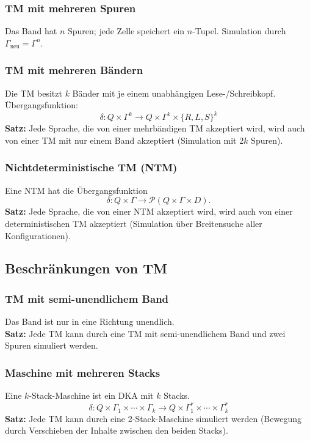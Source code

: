 \subsubsection{TM mit mehreren Spuren}
Das Band hat \(n\) Spuren; jede Zelle speichert ein \(n\)-Tupel. Simulation durch
\(\Gamma_{\text{neu}} = \Gamma^n\).

\subsubsection{TM mit mehreren Bändern}
Die TM besitzt \(k\) Bänder mit je einem unabhängigen Lese-/Schreibkopf.
Übergangsfunktion:
\[
    \delta : Q \times \Gamma^k \to Q \times \Gamma^k \times \{R, L, S\}^k
\]
\textbf{Satz:} Jede Sprache, die von einer mehrbändigen TM akzeptiert wird, wird auch von einer TM mit nur einem Band akzeptiert (Simulation mit \(2k\) Spuren).

\subsubsection{Nichtdeterministische TM (NTM)}
Eine NTM hat die Übergangsfunktion
\[
    \delta : Q \times \Gamma \to \mathcal{P}(Q \times \Gamma \times D).
\]
\textbf{Satz:} Jede Sprache, die von einer NTM akzeptiert wird, wird auch von einer deterministischen TM akzeptiert (Simulation über Breitensuche aller Konfigurationen).

\subsection{Beschränkungen von TM}

\subsubsection{TM mit semi-unendlichem Band}
Das Band ist nur in eine Richtung unendlich. \\
\textbf{Satz:} Jede TM kann durch eine TM mit semi-unendlichem Band und zwei Spuren simuliert werden.

\subsubsection{Maschine mit mehreren Stacks}
Eine \(k\)-Stack-Maschine ist ein DKA mit \(k\) Stacks.
\[
    \delta : Q \times \Gamma_1 \times \cdots \times \Gamma_k \to Q \times \Gamma_1^* \times \cdots \times \Gamma_k^*
\]
\textbf{Satz:} Jede TM kann durch eine 2-Stack-Maschine simuliert werden (Bewegung durch Verschieben der Inhalte zwischen den beiden Stacks).

